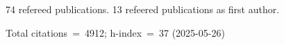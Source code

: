 74 refereed publications. 13 refeered publications as first author.

Total citations~=~4912; h-index~=~37 (2025-05-26)